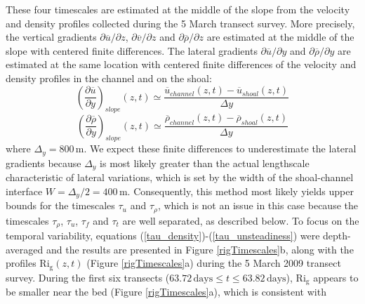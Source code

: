 These four timescales are estimated at the middle of the slope from the velocity and density profiles collected during the 5 March transect survey. More precisely, the vertical gradients $\partial \overline{u} / \partial z$, $\partial \overline{v} / \partial z$ and $\partial \overline{\rho} / \partial z$ are estimated at the middle of the slope with centered finite differences. The lateral gradients $\partial \overline{u} / \partial y$ and $\partial \overline{\rho} / \partial y$ are estimated at the same location with centered finite differences of the velocity and density profiles in the channel and on the shoal:
\begin{equation}
\left(\frac{\partial \overline{u}}{\partial y}\right)_{slope}(z,t) \simeq \frac{\overline{u}_{channel}(z,t) - \overline{u}_{shoal}(z,t)}{\Delta y}
\label{dudy}
\end{equation}
\begin{equation}
\left(\frac{\partial \overline{\rho}}{\partial y}\right)_{slope}(z,t) \simeq \frac{\overline{\rho}_{channel}(z,t) - \overline{\rho}_{shoal}(z,t)}{\Delta y}
\label{drhody}
\end{equation}
where $\Delta_y = 800 \, \mathrm{m}$. We expect these finite differences to underestimate the lateral gradients because $\Delta_y$ is most likely greater than the actual lengthscale characteristic of lateral variations, which is set by the width of the shoal-channel interface $W = \Delta_y / 2 = 400 \, \mathrm{m}$. Consequently, this method most likely yields upper bounds for  the timescales $\tau_u$ and $\tau_{\rho}$, which is not an issue in this case because the timescales $\tau_{\rho}$, $\tau_u$, $\tau_{f}$ and $\tau_t$ are well separated, as described below. To focus on the temporal variability, equations (\ref{tau_density})-(\ref{tau_unsteadiness}) were depth-averaged and the results are presented in Figure \ref{rigTimescales}b, along with the profiles $\mathrm{Ri_g}(z,t)$ (Figure \ref{rigTimescales}a) during the 5 March 2009 transect survey. During the first six transects ($63.72\, \mathrm{days} \leq t \leq 63.82 \, \mathrm{days}$), $\mathrm{Ri_g}$ appears to be smaller near the bed (Figure \ref{rigTimescales}a), which is consistent with 
